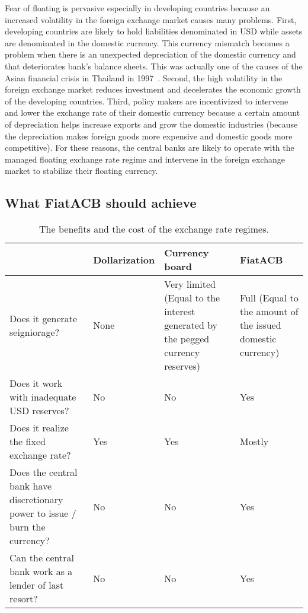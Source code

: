 \documentclass[dvipdfmx,a4paper]{article}
\begin{document}
Fear of floating is pervasive especially in developing countries because an increased volatility in the foreign exchange market causes many problems. First, developing countries are likely to hold liabilities denominated in USD while assets are denominated in the domestic currency. This currency mismatch becomes a problem when there is an unexpected depreciation of the domestic currency and that deteriorates bank's balance sheets. This was actually one of the causes of the Asian financial crisis in Thailand in 1997~\cite{radelet1998east}. Second, the high volatility in the foreign exchange market reduces investment and decelerates the economic growth of the developing countries. Third, policy makers are incentivized to intervene and lower the exchange rate of their domestic currency because a certain amount of depreciation helps increase exports and grow the domestic industries (because the depreciation makes foreign goods more expensive and domestic goods more competitive). For these reasons, the central banks are likely to operate with the managed floating exchange rate regime and intervene in the foreign exchange market to stabilize their floating currency.

\subsection{What FiatACB should achieve}

\begin{table}[tb]
\begin{center}
\caption{The benefits and the cost of the exchange rate regimes.}\vspace{2ex}
\begin{tabular}{p{14em}|l|p{10em}|p{8em}}\hline
& Dollarization & Currency board & FiatACB\\\hline
Does it generate seigniorage? & None & Very limited (Equal to the interest generated by the pegged currency reserves) & Full (Equal to the amount of the issued domestic currency)\\
Does it work with inadequate USD reserves? & No & No & Yes\\
Does it realize the fixed exchange rate? & Yes & Yes & Mostly\\
Does the central bank have discretionary power to issue / burn the currency? & No & No & Yes\\
Can the central bank work as a lender of last resort? & No & No & Yes\\\hline
\end{tabular}
\label{pros_cons_regimes}
\end{center}
\end{table}
\end{document}
